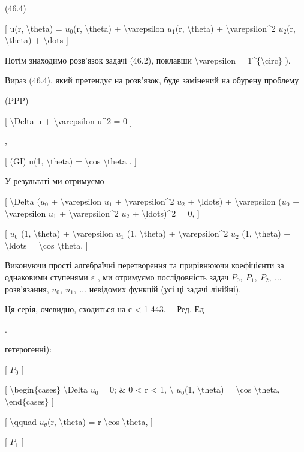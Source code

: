 \documentclass[
]{article}
\begin{document}
{{{(46.4)

{[} u(r, \textbackslash theta) = \(u_0\)(r, \textbackslash theta) +
\textbackslash varepsilon \(u_1\)(r, \textbackslash theta) +
\textbackslash varepsilon\^{}2 \(u_2\)(r, \textbackslash theta) +
\textbackslash dots {]}

Потім знаходимо розв'язок задачі (46.2), поклавши
\textbackslash varepsilon = 1\^{}\{\textbackslash circ\} ).

Вираз (46.4), який претендує на розв'язок, буде замінений на обурену
проблему

(PPP)

{[} \textbackslash Delta u + \textbackslash varepsilon u\^{}2 = 0 {]}

,

{[} (GI) u(1, \textbackslash theta) = \textbackslash cos
\textbackslash theta . {]}

У результаті ми отримуємо

{[} \textbackslash Delta (\(u_0\) + \textbackslash varepsilon \(u_1\) +
\textbackslash varepsilon\^{}2 \(u_2\) + \textbackslash ldots) +
\textbackslash varepsilon (\(u_0\) + \textbackslash varepsilon \(u_1\) +
\textbackslash varepsilon\^{}2 \(u_2\) + \textbackslash ldots)\^{}2 = 0,
{]}

{[} \(u_0\) (1, \textbackslash theta) + \textbackslash varepsilon
\(u_1\) (1, \textbackslash theta) + \textbackslash varepsilon\^{}2
\(u_2\) (1, \textbackslash theta) + \textbackslash ldots =
\textbackslash cos \textbackslash theta. {]}

Виконуючи прості алгебраїчні перетворення та прирівнюючи коефіцієнти за
однаковими ступенями \(\varepsilon\) , ми отримуємо послідовність задач
\(P_0,\ P_1,\ P_2,\ \dots\) розв'язання, \(u_0,\ u_1,\ \dots\) невідомих
функцій (усі ці задачі лінійні).

Ця серія, очевидно, сходиться на \textbar{} є \textbar{} \textless{} 1
443.--- Ред. Ед

.

гетерогенні):

{[} \(P_{0}\) {]}

{[} \textbackslash begin\{cases\} \textbackslash Delta \(u_{0} = 0\); \&
0 \textless{} r \textless{} 1, \textbackslash{} \(u_{0}\)(1,
\textbackslash theta) = \textbackslash cos \textbackslash theta,
\textbackslash end\{cases\} {]}

{[} \textbackslash qquad \(u_{\theta}\)(r, \textbackslash theta) = r
\textbackslash cos \textbackslash theta, {]}

{[} \(P_{1}\) {]}

}}}
\end{document}
